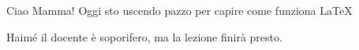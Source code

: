 \documentclass[a4paper,12pt]{article}
\begin{document}
Ciao Mamma! {\tiny Oggi sto uscendo pazzo per capire come funziona \LaTeX}


\Huge
Haimé il docente è soporifero, ma la lezione finirà presto.
\end{document}
